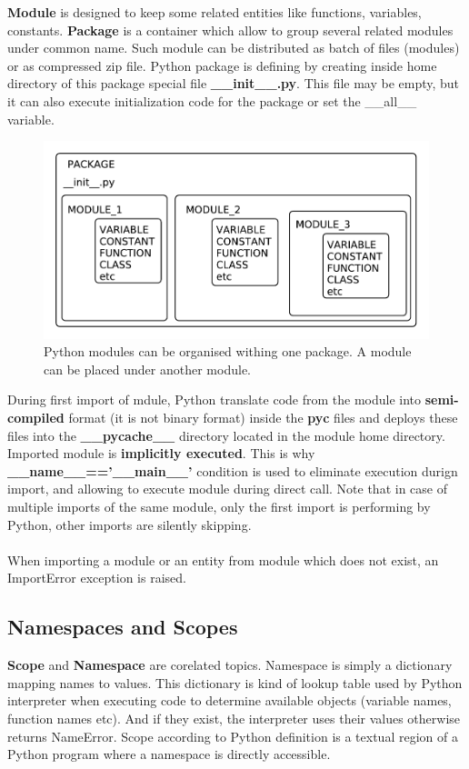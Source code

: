 \documentclass{article}
\begin{document}
\textbf{Module} is designed to keep some related entities like functions, variables, constants. \textbf{Package} is a container which allow to group several related modules under common name. Such module can be distributed as batch of files (modules) or as compressed zip file. Python package is defining by creating inside home directory of this package special file \textbf{\_\_init\_\_.py}. This file may be empty, but it can also execute initialization code for the package or set the \_\_all\_\_ variable.
\begin{figure}[!htbp]
\centering
\includegraphics[scale=0.7]{pi_package_module_entity.pdf}
\caption{\label{fig:label}Python modules can be organised withing one package. A module can be placed under another module.}
\end{figure}
During first import of mdule, Python translate code from the module into \textbf{semi-compiled} format (it is not binary format) inside the \textbf{pyc} files and deploys these files into the \textbf{\_\_pycache\_\_} directory located in the module home directory. Imported module is \textbf{implicitly executed}. This is why \textbf{\_\_name\_\_=='\_\_main\_\_'} condition is used to eliminate execution durign import, and allowing to execute module during direct call. Note that in case of multiple imports of the same module, only the first import is performing by Python, other imports are silently skipping.
\paragraph{}
When importing a module or an entity from module which does not exist, an \textcolor{pythonerror}{ImportError} exception is raised.

\subsection{Namespaces and Scopes}
\textbf{Scope} and \textbf{Namespace} are corelated topics. Namespace is simply a dictionary mapping names to values. This dictionary is kind of lookup table used by Python interpreter when executing code to determine available objects (variable names, function names etc). And if they exist, the interpreter uses their values otherwise returns \textcolor{pythonerror}{NameError}. Scope according to Python definition is a textual region of a Python program where a namespace is directly accessible.
\end{document}
